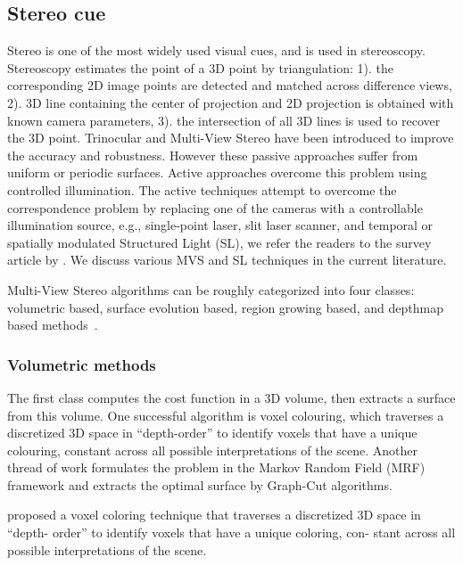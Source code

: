 \subsection{Stereo cue}
Stereo is one of the most widely used visual cues, and is used in stereoscopy. Stereoscopy estimates the point of a 3D point by triangulation: 1). the corresponding 2D image points are detected and matched across difference views, 2). 3D line containing the center of projection and 2D projection is obtained with known camera parameters, 3). the intersection of all 3D lines is used to recover the 3D point. Trinocular and Multi-View Stereo have been introduced to improve the accuracy and robustness. However these passive approaches suffer from uniform or periodic surfaces. Active approaches overcome this problem using controlled illumination. The active techniques attempt to overcome the correspondence problem by replacing one of the cameras with a controllable illumination source, e.g., single-point laser, slit laser scanner, and temporal or spatially modulated Structured Light (SL), we refer the readers to the survey article by \citeauthor{blais2004review}. We discuss various MVS and SL techniques in the current literature.

Multi-View Stereo algorithms can be roughly categorized into four classes: volumetric based, surface evolution based, region growing based, and depthmap based methods~\cite{seitz2006comparison}.

\subsubsection{Volumetric methods}
The first class computes the cost function in a 3D volume, then extracts a surface from this volume. One successful algorithm is voxel colouring, which traverses a discretized 3D space in “depth-order” to identify voxels that have a unique colouring, constant across all possible interpretations of the scene. Another thread of work formulates the problem in the Markov Random Field (MRF) framework and extracts the optimal surface by Graph-Cut algorithms.

\citeauthor{seitz2006comparison} proposed a voxel coloring technique that traverses a discretized 3D space in “depth- order” to identify voxels that have a unique coloring, con- stant across all possible interpretations of the scene.

